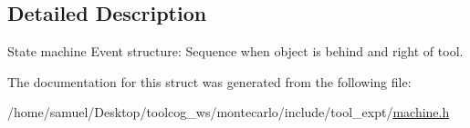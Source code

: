 \subsection{Detailed Description}
State machine Event structure\+: Sequence when object is behind and right of tool. 

The documentation for this struct was generated from the following file\+:\begin{DoxyCompactItemize}
\item 
/home/samuel/\+Desktop/toolcog\+\_\+ws/montecarlo/include/tool\+\_\+expt/\hyperlink{machine_8h}{machine.\+h}\end{DoxyCompactItemize}
